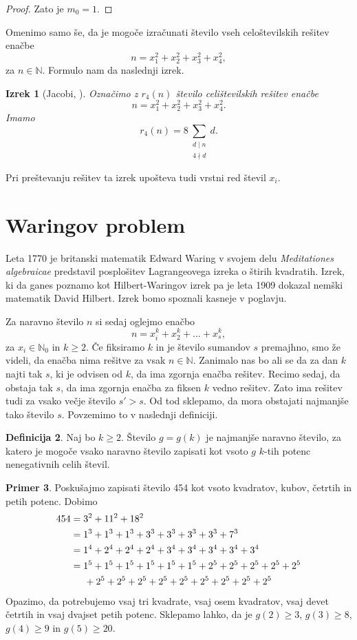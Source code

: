 \documentclass[a4paper]{amsart}
\newcommand{\NN}{\mathbb{N}}
\theoremstyle{definition}
\newtheorem{definicija}{Definicija}[section]
\newtheorem{primer}[definicija]{Primer}
\theoremstyle{plain}
\newtheorem{izrek}[definicija]{Izrek}
\numberwithin{equation}{section}
\begin{document}
\begin{proof}
	Zato je $m_0=1$.
\end{proof}

Omenimo samo še, da je mogoče izračunati število vseh celoštevilskih rešitev enačbe $$n=x_1^2+x_2^2+x_3^2+x_4^2,$$ za $n\in\NN$. Formulo nam da naslednji izrek.

\begin{izrek}[Jacobi, \cite{Jacobi}]
	Označimo z $r_4(n)$ število celištevilskih rešitev enačbe $$n=x_1^2 + x_2^2+x_3^2+x_4^2.$$ Imamo $$r_4(n)= 8\sum_{\substack{d\mid n \\ 4 \nmid d}}d.$$
\end{izrek}
Pri preštevanju rešitev ta izrek upošteva tudi vrstni red števil $x_i$.

\section{Waringov problem}\label{waring}

Leta 1770 je britanski matematik Edward Waring v svojem delu \emph{Meditationes algebraicae} predstavil posplošitev Lagrangeovega izreka o štirih kvadratih. Izrek, ki da ganes poznamo kot Hilbert-Waringov izrek pa je leta 1909 dokazal nemški matematik David Hilbert. Izrek bomo spoznali kasneje v poglavju.

Za naravno število $n$ si sedaj oglejmo enačbo $$n=x_i^k+x_2^k +\ldots + x_s^k,$$ za $x_i\in\NN_0$ in $k\geqslant 2$. Če fiksiramo $k$ in je število sumandov $s$ premajhno, smo že videli, da enačba nima rešitve za vsak $n\in\NN$. Zanimalo nas bo ali se da za dan $k$ najti tak $s$, ki je odvisen od $k$, da ima zgornja enačba rešitev. Recimo sedaj, da obstaja tak $s$, da ima zgornja enačba za fiksen $k$ vedno rešitev. Zato ima rešitev tudi za vsako večje število $s'>s$. Od tod sklepamo, da mora obstajati najmanjše tako število $s$. Povzemimo to v naslednji definiciji.

\begin{definicija}
	Naj bo $k\geqslant 2$. Število $g=g(k)$ je najmanjše naravno število, za katero je mogoče vsako  naravno število zapisati kot vsoto $g$ $k$-tih potenc nenegativnih celih števil.
\end{definicija}

\begin{primer}
	Poskušajmo zapisati število 454 kot vsoto kvadratov, kubov, četrtih in petih potenc. Dobimo
	\begin{align*}
		454 &= 3^2+11^2+18^2 \\
			&= 1^3+1^3+1^3+3^3+3^3+3^3+3^3+7^3 \\ 
			&= 1^4 + 2^4+2^4+2^4+3^4+3^4+3^4+3^4+3^4 \\ 
			&= 1^5+1^5+1^5+1^5+1^5+1^5 + 2^5 + 2^5 + 2^5 + 2^5 + 2^5 \\
			 &\hspace{0.5cm}+ 2^5 + 2^5 + 2^5 + 2^5 + 2^5 + 2^5 + 2^5 + 2^5 + 2^5
	  \end{align*}
	  Opazimo, da potrebujemo vsaj tri kvadrate, vsaj osem kvadratov, vsaj devet četrtih in vsaj dvajset petih potenc. Sklepamo lahko, da je $g(2)\geqslant 3$, $g(3) \geqslant 8$, $g(4)\geqslant 9$ in $g(5) \geqslant 20$.
\end{primer}
\end{document}
